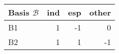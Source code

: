 \begin{table}[H]
\centering\begingroup\fontsize{7}{9}\selectfont

\begin{tabular}{lrrr}
\toprule
Basis $\mathcal{B}$ & ind & esp & other\\
\midrule
B1 & 1 & -1 & 0\\
B2 & 1 & 1 & -1\\
\bottomrule
\end{tabular}
\endgroup{}
\end{table}
